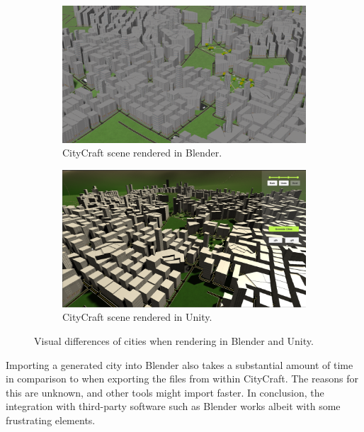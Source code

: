 \begin{figure}[H]
  \centering
  \begin{subfigure}[b]{0.48\textwidth}
    \includegraphics[width=\textwidth]{figure/blender_unity_comparison_blender}
    \caption{CityCraft scene rendered in Blender.}
  \end{subfigure}
  \quad
  \begin{subfigure}[b]{0.48\textwidth}
    \includegraphics[width=\textwidth]{figure/blender_unity_comparison_unity}
    \caption{CityCraft scene rendered in Unity.}
  \end{subfigure}
  \caption{Visual differences of cities when rendering in Blender and Unity.}
  \label{fig:blender_unity_comparison}
\end{figure}

Importing a generated city into Blender also takes a substantial amount of time in comparison to when exporting the files from within CityCraft.
The reasons for this are unknown, and other tools might import faster.
In conclusion, the integration with third-party software such as Blender works albeit with some frustrating elements.

